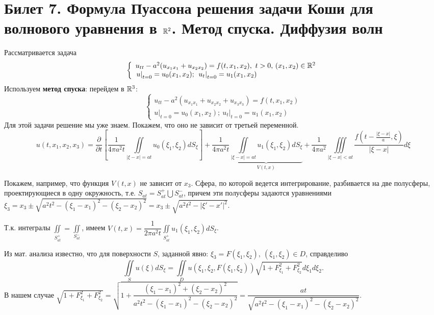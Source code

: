\section{Билет 7. Формула Пуассона решения задачи Коши для волнового уравнения в $\mathbb{R}^2$. Метод спуска. Диффузия волн}
Рассматривается задача
\begin{equation}
\label{eq::7::cauchy}
\left\{
  \begin{array}{ll}
  u_{tt}-a^2(u_{x_1x_1}+u_{x_2x_2})=f(t,x_1,x_2),\ t>0,\, (x_1, x_2)\in \mathbb{R}^2\\
  \left. u\right|_{t=0}=u_0(x_1, x_2);\ \left. u_t\right|_{t=0}=u_1(x_1, x_2)
  \end{array}
\right.
\end{equation}
Используем \textbf{метод спуска}: перейдем в $\mathbb{R}^3$:
\begin{equation*}
\left\{
  \begin{array}{ll}
  u_{tt}-a^2(u_{x_1x_1}+u_{x_2x_2}+u_{x_3x_3})=f(t,x_1,x_2)\\
  \left. u\right|_{t=0}=u_0(x_1, x_2);\ \left. u_t\right|_{t=0}=u_1(x_1, x_2)
  \end{array}
\right.
\end{equation*}
Для этой задачи решение мы уже знаем. Покажем, что оно не зависит от третьей переменной.
\[
u(t, x_1, x_2, x_3)=\frac{\partial}{\partial t}\left[\frac{1}{4\pi a^2t}\iint\limits_{|\xi - x|=at}u_0(\xi_1, \xi_2)dS_{\xi} \right]+\frac{1}{4\pi a^2t}\underbrace{\iint\limits_{|\xi - x|=at}u_1(\xi_1, \xi_2)dS_{\xi}}_{V(t,x)}+\frac{1}{4\pi a^2}\iiint\limits_{|\xi - x|<at}\frac{f\left(t-\frac{|\xi - x|}{a}, \xi \right)}{|\xi - x|}d\xi
\]

Покажем, например, что функция $V(t,x)$ не зависит от $x_3$.
Сфера, по которой ведется интегрирование, разбивается на две полусферы, проектирующиеся в одну окружность, т.е. $S_{at}=S_{at}^+\bigcup S_{at}^-$, причем эти полусферы задаются уравнениями $\xi_3=x_3\pm \sqrt{a^2t^2-(\xi_1 -x_1)^2-(\xi_2 -x_2)^2}=x_3\pm \sqrt{a^2t^2-|\xi '-x'|^2}$.

Т.к. интегралы $\displaystyle\iint\limits_{S_{at}^+}=\iint\limits_{S_{at}^-}$, имеем $V(t,x)=\dfrac{1}{2\pi a^2t}\displaystyle\iint\limits_{S_{at}^+}u_1(\xi_1, \xi_2)dS_{\xi}$.

Из мат. анализа известно, что для поверхности $S$, заданной явно: $\xi_3=F(\xi_1, \xi_2),\ (\xi_1, \xi_2)\in D$, справделиво 
\[
\iint\limits_S u(\xi )dS_{\xi}=\iint\limits_D u\left( \xi_1, \xi_2, F(\xi_1, \xi_2)\right)\sqrt{1+F_{\xi_1}^2+F_{\xi_2}^2}d\xi_1d\xi_2.
\]
В нашем случае $\sqrt{1+F_{\xi_1}^2+F_{\xi_2}^2}=\sqrt{1+\dfrac{(\xi_1 - x_1)^2+(\xi_2 - x_2)^2}{a^2t^2 - (\xi_1 - x_1)^2-(\xi_2 - x_2)^2}}=\dfrac{at}{\sqrt{a^2t^2 - (\xi_1 - x_1)^2-(\xi_2 - x_2)^2}}$.


